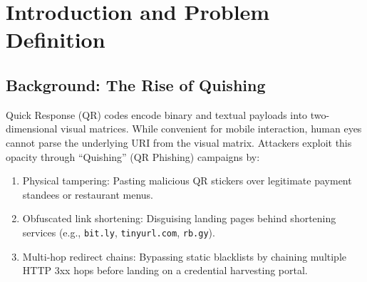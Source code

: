 \documentclass[12pt,a4paper]{report}
\begin{document}
\begin{abstract}
Quick Response (QR) codes have become ubiquitous across payment systems, event ticketing, and retail authentication. However, their visual opacity exposes end users to Quick Response Phishing (``Quishing'') attacks, in which malicious destination URLs and deceptive HTTP redirect chains are concealed behind legitimate-looking physical codes. Operating persistent, 24/7 containerized or virtual-machine backend servers to validate intermittent, bursty QR scans leads to severe resource underutilization and high idle costs.

This report presents \textbf{QR-Shield}, an event-driven, 100\% serverless architecture for real-time QR code threat inspection. Designed to operate under strict Function-as-a-Service (FaaS) resource boundaries (128~MB RAM, 6.0~second execution ceiling), the system executes a multi-stage validation pipeline: SHA-256 dual-layer caching, multi-hop HTTP redirect unrolling (up to 5 hops), an 8-rule deterministic heuristic engine, and abuse.ch URLhaus threat intelligence verification. 

Evaluated across local LocalStack AWS emulation and live Vercel edge infrastructure, QR-Shield achieves sub-30~ms response times on warm cache hits, completes cold-start initialization in under 150~ms through zero external pip dependencies, and incurs zero ongoing idle compute costs. The project maps directly to Course Outcomes CO1 through CO5 of the Serverless Computing curriculum.
\end{abstract}

\newpage
{}

\chapter{Introduction and Problem Definition}

\section{Background: The Rise of Quishing}
Quick Response (QR) codes encode binary and textual payloads into two-dimensional visual matrices. While convenient for mobile interaction, human eyes cannot parse the underlying URI from the visual matrix. Attackers exploit this opacity through ``Quishing'' (QR Phishing) campaigns by:
\begin{enumerate}
    \item Physical tampering: Pasting malicious QR stickers over legitimate payment standees or restaurant menus.
    \item Obfuscated link shortening: Disguising landing pages behind shortening services (e.g., \texttt{bit.ly}, \texttt{tinyurl.com}, \texttt{rb.gy}).
    \item Multi-hop redirect chains: Bypassing static blacklists by chaining multiple HTTP 3xx hops before landing on a credential harvesting portal.
\end{enumerate}
\end{document}
